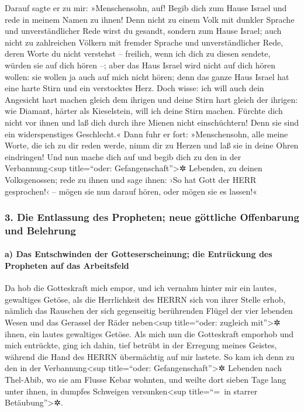 Darauf sagte er zu mir: »Menschensohn, auf! Begib dich zum
Hause Israel und rede in meinem Namen zu ihnen! Denn nicht
zu einem Volk mit dunkler Sprache und unverständlicher Rede wirst du
gesandt, sondern zum Hause Israel; auch nicht zu
zahlreichen Völkern mit fremder Sprache und unverständlicher Rede, deren
Worte du nicht verstehst -- freilich, wenn ich dich zu diesen sendete,
würden sie auf dich hören --; aber das Haus Israel wird
nicht auf dich hören wollen: sie wollen ja auch auf mich nicht hören;
denn das ganze Haus Israel hat eine harte Stirn und ein verstocktes
Herz. Doch wisse: ich will auch dein Angesicht hart machen
gleich dem ihrigen und deine Stirn hart gleich der ihrigen:
wie Diamant, härter als Kieselstein, will ich deine Stirn
machen. Fürchte dich nicht vor ihnen und laß dich durch ihre Mienen
nicht einschüchtern! Denn sie sind ein widerspenstiges Geschlecht.«
Dann fuhr er fort: »Menschensohn, alle meine Worte, die
ich zu dir reden werde, nimm dir zu Herzen und laß sie in deine Ohren
eindringen! Und nun mache dich auf und begib dich zu den
in der Verbannung\textless sup title=``oder:
Gefangenschaft''\textgreater✲ Lebenden, zu deinen Volksgenossen; rede zu
ihnen und sage ihnen: ›So hat Gott der HERR gesprochen!‹ -- mögen sie
nun darauf hören, oder mögen sie es lassen!«

\hypertarget{die-entlassung-des-propheten-neue-guxf6ttliche-offenbarung-und-belehrung}{%
\subsubsection{3. Die Entlassung des Propheten; neue göttliche
Offenbarung und
Belehrung}\label{die-entlassung-des-propheten-neue-guxf6ttliche-offenbarung-und-belehrung}}

\hypertarget{a-das-entschwinden-der-gotteserscheinung-die-entruxfcckung-des-propheten-auf-das-arbeitsfeld}{%
\paragraph{a) Das Entschwinden der Gotteserscheinung; die Entrückung des
Propheten auf das
Arbeitsfeld}\label{a-das-entschwinden-der-gotteserscheinung-die-entruxfcckung-des-propheten-auf-das-arbeitsfeld}}

Da hob die Gotteskraft mich empor, und ich vernahm hinter
mir ein lautes, gewaltiges Getöse, als die Herrlichkeit des HERRN sich
von ihrer Stelle erhob, nämlich das Rauschen der sich
gegenseitig berührenden Flügel der vier lebenden Wesen und das Gerassel
der Räder neben\textless sup title=``oder: zugleich mit''\textgreater✲
ihnen, ein lautes gewaltiges Getöse. Als mich nun die
Gotteskraft emporhob und mich entrückte, ging ich dahin, tief betrübt in
der Erregung meines Geistes, während die Hand des HERRN übermächtig auf
mir lastete. So kam ich denn zu den in der
Verbannung\textless sup title=``oder: Gefangenschaft''\textgreater✲
Lebenden nach Thel-Abib, wo sie am Flusse Kebar wohnten, und weilte dort
sieben Tage lang unter ihnen, in dumpfes Schweigen
versunken\textless sup title=``=~in starrer Betäubung''\textgreater✲.

